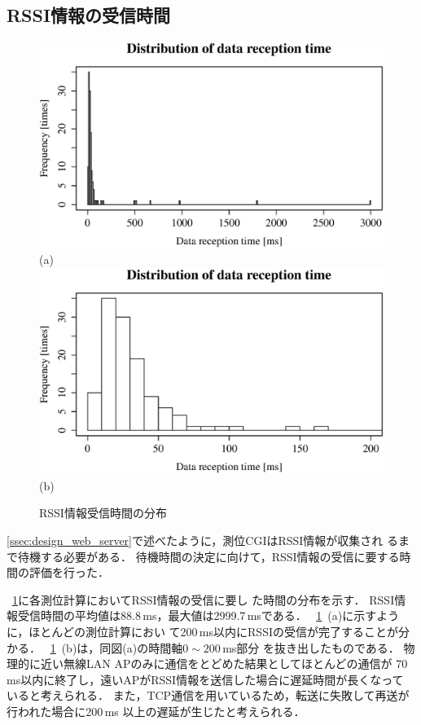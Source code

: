 \documentclass[technicalreport]{ieicej}
\begin{document}
\subsection{RSSI情報の受信時間}
\label{ssec:rssi_rx_time}

\begin{figure}[bt]
 \centering
 \includegraphics[width=0.8\columnwidth]{figure/recv_time.eps} \\
 (a)\\
 \includegraphics[width=0.8\columnwidth]{figure/recv_time_detail.eps} \\
 (b)
 \caption{RSSI情報受信時間の分布}
 \label{fig:recv_time}
\end{figure}

\ref{ssec:design_web_server}で述べたように，測位CGIはRSSI情報が収集され
るまで待機する必要がある．
待機時間の決定に向けて，RSSI情報の受信に要する時間の評価を行った．

\figurename~\ref{fig:recv_time}に各測位計算においてRSSI情報の受信に要し
た時間の分布を示す．
RSSI情報受信時間の平均値は88.8\,ms，最大値は2999.7\,msである．
\figurename~\ref{fig:recv_time}~(a)に示すように，ほとんどの測位計算におい
て200\,ms以内にRSSIの受信が完了することが分かる．
\figurename~\ref{fig:recv_time}~(b)は，同図(a)の時間軸$0\sim200$\,ms部分
を抜き出したものである．
物理的に近い無線LAN APのみに通信をとどめた結果としてほとんどの通信が
70\,ms以内に終了し，遠いAPがRSSI情報を送信した場合に遅延時間が長くなって
いると考えられる．
また，TCP通信を用いているため，転送に失敗して再送が行われた場合に200\,ms
以上の遅延が生じたと考えられる．
\end{document}
